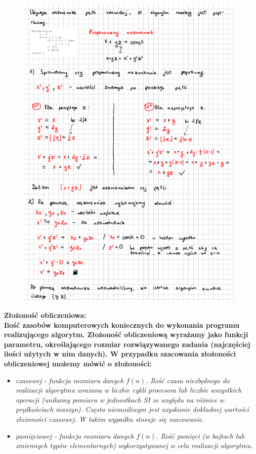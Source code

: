 \documentclass[a4paper,12pt]{article}
\newcommand{\h}[1]{\noindent \bf #1 \rm \\ \noindent}
\newcommand{\italic}[1]{\it #1 \rm}
\begin{document}
\begin{figure}[H]
	\centering
	\includegraphics[width=14cm]{niezmiennik.png}
\end{figure}

\newpage

\h{Złożoność obliczeniowa:}
Ilość zasobów komputerowych koniecznych do wykonania programu realizującego algorytm. Złożoność obliczeniową wyrażamy jako funkcji parametru, określającego rozmiar rozwiązywanego zadania (najczęściej ilości użytych w nim danych). W przypadku szacowania złożoności obliczeniowej możemy mówić o złożoności:
\begin{itemize}
	\item \italic{czasowej} - funkcja rozmiaru danych $f(n)$. Ilość czasu niezbędnego do realizacji algorytmu wrażana w liczbie cykli procesora lub liczbie wszystkich operacji (unikamy pomiaru w jednostkach SI ze względu na różnice w prędkościach maszyn). Często niemożliwym jest uzyskanie dokładnej wartości złożoności czasowej. W takim wypadku stosuje się szacowanie.
	\item \italic{pamięciowej} - funkcja rozmiaru danych $f(n)$. Ilość pamięci (w bajtach lub zmiennych typów elementarnych) wykorzystywanej w celu realizacji algorytmu.
\end{itemize}
\end{document}
